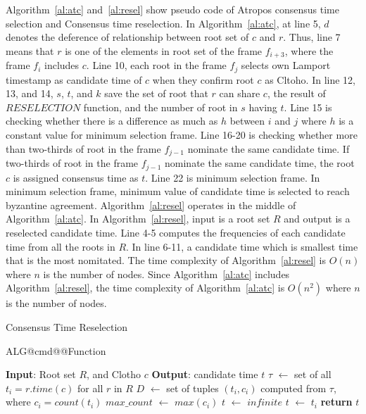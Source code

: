 \documentclass[preprint,12pt]{elsarticle}
\makeatletter
\renewcommand{\Function}[2]{%
  \csname ALG@cmd@\ALG@L @Function\endcsname{#1}{#2}%
  \def\jayden@currentfunction{#1}%
}
\newcommand{\funclabel}[1]{%
  \@bsphack
  \protected@write\@auxout{}{%
    \string\newlabel{#1}{{\jayden@currentfunction}{\thepage}}%
  }%
  \@esphack
}
\makeatother
\begin{document}
Algorithm~\ref{al:atc} and~\ref{al:resel} show pseudo code of Atropos consensus time selection and Consensus time reselection. In Algorithm~\ref{al:atc}, at line 5, $d$ denotes the deference of relationship between root set of $c$ and $r$. Thus, line 7 means that $r$ is one of the elements in root set of the frame $f_{i+3}$, where the frame $f_i$ includes $c$. Line 10, each root in the frame $f_j$ selects own Lamport timestamp as candidate time of $c$ when they confirm root $c$ as Cltoho. In line 12, 13, and 14, $s$, $t$, and $k$ save the set of root that $r$ can share $c$, the result of $RESELECTION$ function, and the number of root in $s$ having $t$. Line 15 is checking whether there is a difference as much as $h$ between $i$ and $j$ where $h$ is a constant value for minimum selection frame. Line 16-20 is checking whether more than two-thirds of root in the frame $f_{j-1}$ nominate the same candidate time. If two-thirds of root in the frame $f_{j-1}$ nominate the same candidate time, the root $c$ is assigned consensus time as $t$. Line 22 is minimum selection frame. In minimum selection frame, minimum value of candidate time is selected to reach byzantine agreement. Algorithm~\ref{al:resel} operates in the middle of Algorithm~\ref{al:atc}. In Algorithm~\ref{al:resel}, input is a root set $R$ and output is a reselected candidate time. Line 4-5 computes the frequencies of each candidate time from all the roots in $R$. In line 6-11, a candidate time which is smallest time that is the most nomitated. The time complexity of Algorithm~\ref{al:resel} is $O(n)$ where $n$ is the number of nodes. Since Algorithm~\ref{al:atc} includes Algorithm~\ref{al:resel}, the time complexity of Algorithm~\ref{al:atc} is $O(n^2)$ where $n$ is the number of nodes.

\begin{algorithm} [H]
\caption{Consensus Time Reselection}\label{al:resel}
\begin{algorithmic}[1]
\Function{Reselection}{} \funclabel{alg:a}
    \State \textbf{Input}: Root set $R$, and Clotho $c$
    \State \textbf{Output}: candidate time $t$
    \State $\tau$ $\leftarrow$ set of all $t_i = r.time(c)$ for all $r$ in $R$
    \State $D$  $\leftarrow$ set of tuples $(t_i, c_i)$ computed from $\tau$, where $c_i= count(t_i)$
    \State $max\_count$ $\leftarrow$ $max(c_i)$
    \State $t$ $\leftarrow$ $infinite$
            \State $t$ $\leftarrow$ $t_i$
        \EndIf
    \EndFor
    \State \textbf{return} $t$
\EndFunction
\end{algorithmic}
\end{algorithm}
\end{document}
